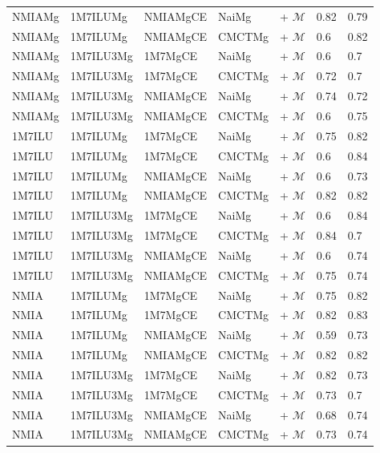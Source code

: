 \documentclass[a4,center,fleqn]{NAR}
\begin{document}
\begin{itemize}
\begin{table}[h]
\begin{adjustbox}{max width=.5\textwidth}
\begin{tabular}{@{}lllllHH@{}}
				NMIAMg	&	1M7ILUMg	&	NMIAMgCE	&	NaiMg	&	+ $\mathcal{M}$	&	0.82	&	0.79	\\
NMIAMg	&	1M7ILUMg	&	NMIAMgCE	&	CMCTMg	&	+ $\mathcal{M}$	&	0.6	&	0.82	\\
NMIAMg	&	1M7ILU3Mg	&	1M7MgCE	&	NaiMg	&	+ $\mathcal{M}$	&	0.6	&	0.7	\\
NMIAMg	&	1M7ILU3Mg	&	1M7MgCE	&	CMCTMg	&	+ $\mathcal{M}$	&	0.72	&	0.7	\\
NMIAMg	&	1M7ILU3Mg	&	NMIAMgCE	&	NaiMg	&	+ $\mathcal{M}$	&	0.74	&	0.72	\\
NMIAMg	&	1M7ILU3Mg	&	NMIAMgCE	&	CMCTMg	&	+ $\mathcal{M}$	&	0.6	&	0.75	\\
1M7ILU	&	1M7ILUMg	&	1M7MgCE	&	NaiMg	&	+ $\mathcal{M}$	&	0.75	&	0.82	\\
1M7ILU	&	1M7ILUMg	&	1M7MgCE	&	CMCTMg	&	+ $\mathcal{M}$	&	0.6	&	0.84	\\
1M7ILU	&	1M7ILUMg	&	NMIAMgCE	&	NaiMg	&	+ $\mathcal{M}$	&	0.6	&	0.73	\\
1M7ILU	&	1M7ILUMg	&	NMIAMgCE	&	CMCTMg	&	+ $\mathcal{M}$	&	0.82	&	0.82	\\
1M7ILU	&	1M7ILU3Mg	&	1M7MgCE	&	NaiMg	&	+ $\mathcal{M}$	&	0.6	&	0.84	\\
1M7ILU	&	1M7ILU3Mg	&	1M7MgCE	&	CMCTMg	&	+ $\mathcal{M}$	&	0.84	&	0.7	\\
1M7ILU	&	1M7ILU3Mg	&	NMIAMgCE	&	NaiMg	&	+ $\mathcal{M}$	&	0.6	&	0.74	\\
1M7ILU	&	1M7ILU3Mg	&	NMIAMgCE	&	CMCTMg	&	+ $\mathcal{M}$	&	0.75	&	0.74	\\
NMIA	&	1M7ILUMg	&	1M7MgCE	&	NaiMg	&	+ $\mathcal{M}$	&	0.75	&	0.82	\\
NMIA	&	1M7ILUMg	&	1M7MgCE	&	CMCTMg	&	+ $\mathcal{M}$	&	0.82	&	0.83	\\
NMIA	&	1M7ILUMg	&	NMIAMgCE	&	NaiMg	&	+ $\mathcal{M}$	&	0.59	&	0.73	\\
NMIA	&	1M7ILUMg	&	NMIAMgCE	&	CMCTMg	&	+ $\mathcal{M}$	&	0.82	&	0.82	\\
NMIA	&	1M7ILU3Mg	&	1M7MgCE	&	NaiMg	&	+ $\mathcal{M}$	&	0.82	&	0.73	\\
NMIA	&	1M7ILU3Mg	&	1M7MgCE	&	CMCTMg	&	+ $\mathcal{M}$	&	0.73	&	0.7	\\
NMIA	&	1M7ILU3Mg	&	NMIAMgCE	&	NaiMg	&	+ $\mathcal{M}$	&	0.68	&	0.74	\\
NMIA	&	1M7ILU3Mg	&	NMIAMgCE	&	CMCTMg	&	+ $\mathcal{M}$	&	0.73	&	0.74	\\
	

\end{tabular}
\end{adjustbox}
\end{table}
\end{itemize}
\end{document}
